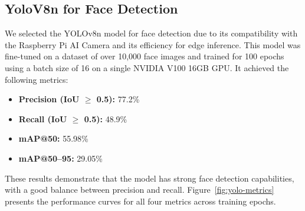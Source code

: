 \subsection{YoloV8n for Face Detection}

We selected the YOLOv8n model for face detection due to its compatibility with the Raspberry Pi AI Camera and its efficiency for edge inference. This model was fine-tuned on a dataset of over 10,000 face images and trained for 100 epochs using a batch size of 16 on a single NVIDIA V100 16GB GPU. It achieved the following metrics:

\begin{itemize}
	\item \textbf{Precision (IoU $\geq$ 0.5):} 77.2\%
	\item \textbf{Recall (IoU $\geq$ 0.5):} 48.9\%
	\item \textbf{mAP@50:} 55.98\%
	\item \textbf{mAP@50--95:} 29.05\%
\end{itemize}

These results demonstrate that the model has strong face detection capabilities, with a good balance between precision and recall. Figure~\ref{fig:yolo-metrics} presents the performance curves for all four metrics across training epochs.

